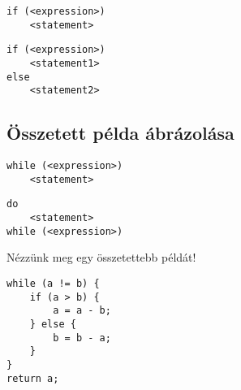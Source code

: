\begin{minipage}{\balhasab}
\begin{lstlisting}
if (<expression>)
	<statement>
\end{lstlisting}
\end{minipage}
\begin{minipage}{\jobbhasab}
\end{minipage}



\begin{minipage}{\balhasab}
\begin{lstlisting}
if (<expression>)
	<statement1>
else
	<statement2>
\end{lstlisting}
\end{minipage}
\begin{minipage}{\jobbhasab}
\end{minipage}

\subsection{Összetett példa ábrázolása}

\begin{minipage}{\balhasab}
\begin{lstlisting}
while (<expression>)
	<statement>
\end{lstlisting}
\end{minipage}
\begin{minipage}{\jobbhasab}
\end{minipage}



\begin{minipage}{\balhasab}
\begin{lstlisting}
do
	<statement>
while (<expression>)
\end{lstlisting}
\end{minipage}
\begin{minipage}{\jobbhasab}
\end{minipage}



Nézzünk meg egy összetettebb példát!

\begin{minipage}{\balhasab}
\begin{lstlisting}
while (a != b) {
	if (a > b) {
		a = a - b;
	} else {
		b = b - a;
	}
}
return a;
\end{lstlisting}
\end{minipage}
\begin{minipage}{\jobbhasab}
\end{minipage}

